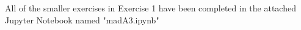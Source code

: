 All of the smaller exercises in Exercise 1 have been completed in the attached Jupyter Notebook named "madA3.ipynb"